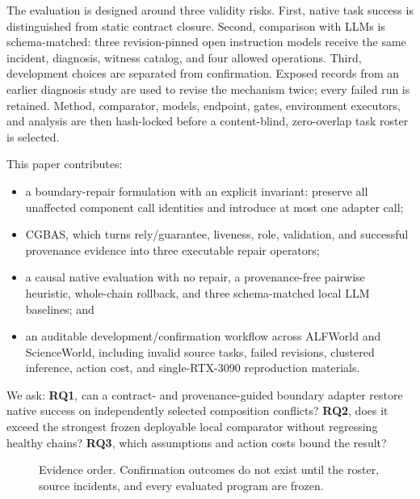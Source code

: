 \documentclass[10pt]{article}
\begin{document}
The evaluation is designed around three validity risks. First, native task
success is distinguished from static contract closure. Second, comparison with
LLMs is schema-matched: three revision-pinned open instruction models receive the
same incident, diagnosis, witness catalog, and four allowed operations. Third,
development choices are separated from confirmation. Exposed records from an
earlier diagnosis study are used to revise the mechanism twice; every failed run
is retained. Method, comparator, models, endpoint, gates, environment executors,
and analysis are then hash-locked before a content-blind, zero-overlap task roster
is selected.

This paper contributes:
\begin{itemize}
  \item a boundary-repair formulation with an explicit invariant: preserve all
  unaffected component call identities and introduce at most one adapter call;
  \item CGBAS, which turns rely/guarantee, liveness, role, validation, and
  successful provenance evidence into three executable repair operators;
  \item a causal native evaluation with no repair, a provenance-free pairwise
  heuristic, whole-chain rollback, and three schema-matched local LLM baselines;
  and
  \item an auditable development/confirmation workflow across ALFWorld and
  ScienceWorld, including invalid source tasks, failed revisions, clustered
  inference, action cost, and single-RTX-3090 reproduction materials.
\end{itemize}

We ask: \textbf{RQ1}, can a contract- and provenance-guided boundary adapter
restore native success on independently selected composition conflicts?
\textbf{RQ2}, does it exceed the strongest frozen deployable local comparator
without regressing healthy chains? \textbf{RQ3}, which assumptions and action
costs bound the result?

\begin{figure}[t]
\centering
{}
\caption{Evidence order. Confirmation outcomes do not exist until the roster,
source incidents, and every evaluated program are frozen.}
\label{fig:evidence-order}
\end{figure}
\end{document}
